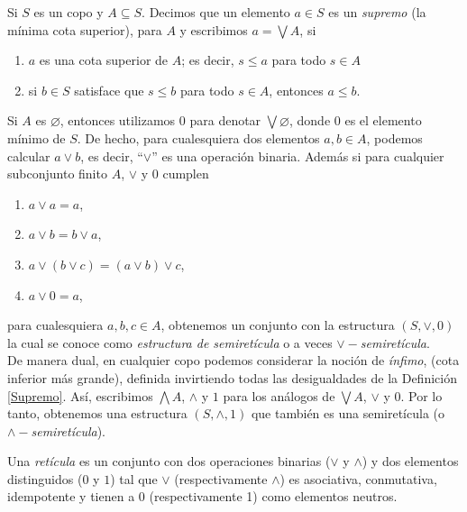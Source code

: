 \begin{dfn}\label{Supremo}
Si $S$ es un copo y $A\subseteq S$. Decimos que un elemento $a\in S$ es un \emph{supremo} (la mínima cota superior), para $A$ y escribimos $a=\bigvee A$, si
\begin{enumerate}
\item $a$ es una cota superior de $A$; es decir, $s\leq a$ para todo $s\in A$
\item si $b\in S$ satisface que $s\leq b$ para todo $s\in A$, entonces $a\leq b$.
\end{enumerate}
\end{dfn}

Si $A$ es $\varnothing$, entonces utilizamos $0$ para denotar $\bigvee \varnothing$, donde $0$ es el elemento mínimo de $S$. De hecho, para cualesquiera dos elementos $a, b\in A$, podemos calcular $a\vee b$, es decir, ``$\vee$'' es una operación binaria. Además si para cualquier subconjunto finito $A$, $\vee$ y $0$ cumplen

\begin{enumerate}
    \item $a\vee a=a$,
    \item $a\vee b= b\vee a$,
    \item $a\vee (b\vee c)=(a\vee b) \vee c$,
    \item $a\vee 0=a$,
\end{enumerate}

para cualesquiera $a,b,c\in A$, obtenemos un conjunto con la estructura $(S, \vee, 0)$ la cual se conoce como \emph{estructura de semiretícula} o a veces \emph{$\vee-$semiretícula}.\\

De manera dual, en cualquier copo podemos considerar la noción de \emph{ínfimo}, (cota inferior más grande), definida invirtiendo todas las desigualdades de la Definición \ref{Supremo}. Así, escribimos $\bigwedge A$, $\wedge$ y $1$ para los análogos de $\bigvee A$, $\vee$ y $0$. Por lo tanto, obtenemos una  estructura $(S, \wedge, 1)$ que también es una semiretícula (o \emph{$\wedge-$semiretícula}).

\begin{dfn}\label{Reticula}
Una \emph{retícula} es un conjunto con dos operaciones binarias ($\vee$ y $\wedge$) y dos elementos distinguidos ($0$ y $1$) tal que $\vee$ (respectivamente $\wedge$) es asociativa, conmutativa, idempotente y tienen a $0$ (respectivamente 1) como elementos neutros.
\end{dfn} 

